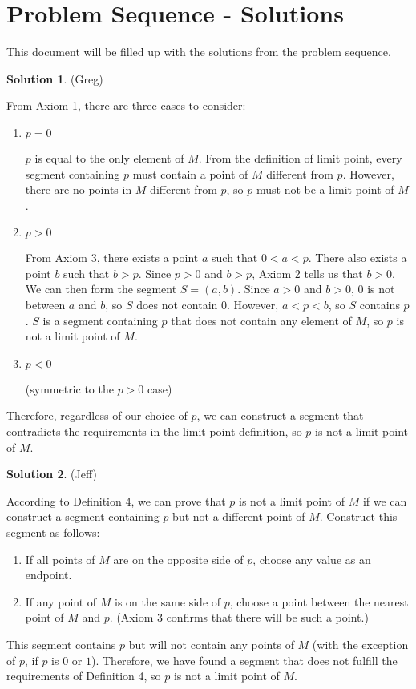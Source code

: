 \documentclass{article}
\theoremstyle{definition}
\newtheorem{solution}{Solution}
\begin{document}
\section*{Problem Sequence - Solutions}
This document will be filled up with the solutions from the problem sequence.

\begin{solution} %
(Greg)

From Axiom 1, there are three cases to consider:
\begin{enumerate}
\item
$p = 0$

$p$ is equal to the only element of $M$. 
From the definition of limit point, every segment containing $p$ must contain a point of $M$ different from $p$. 
However, there are no points in $M$ different from $p$, so $p$ must not be a limit point of $M$.

\item
$p > 0$

From Axiom 3, there exists a point $a$ such that $0 < a < p$. 
There also exists a point $b$ such that $b > p$. 
Since $p > 0$ and $b > p$, Axiom 2 tells us that $b > 0$. 
We can then form the segment $S = (a, b)$. 
Since $a > 0$ and $b > 0$, $0$ is not between $a$ and $b$, so $S$ does not contain $0$. 
However, $a < p < b$, so $S$ contains $p$. 
$S$ is a segment containing $p$ that does not contain any element of $M$, so $p$ is not a limit point of $M$.

\item
$p < 0$

(symmetric to the $p > 0$ case)
\end{enumerate}

Therefore, regardless of our choice of $p$, we can construct a segment that contradicts the requirements in the limit point definition, so $p$ is not a limit point of $M$.
\end{solution}

\begin{solution} %
(Jeff)

According to Definition 4, we can prove that $p$ is not a limit point of $M$ if we can construct a segment containing $p$ but not a different point of $M$.
Construct this segment as follows:

\begin{enumerate}
\item
If all points of $M$ are on the opposite side of $p$, choose any value as an endpoint.

\item
If any point of $M$ is on the same side of $p$, choose a point between the nearest point of $M$ and $p$.
(Axiom 3 confirms that there will be such a point.)
\end{enumerate}

This segment contains $p$ but will not contain any points of $M$ (with the exception of $p$, if $p$ is $0$ or $1$).
Therefore, we have found a segment that does not fulfill the requirements of Definition 4, so $p$ is not a limit point of $M$.
\end{solution}
\end{document}
